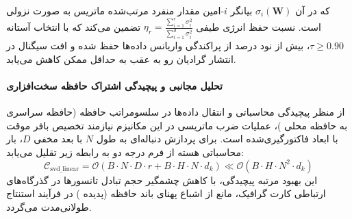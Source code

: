 که در آن $\sigma_i(\mathbf{W})$ بیانگر $i$-امین مقدار منفرد مرتب‌شده ماتریس به صورت نزولی است. نسبت حفظ انرژی طیفی $\eta_r = \frac{\sum_{i=1}^r \sigma_i^2}{\sum_{i=1}^{d} \sigma_i^2}$ تضمین می‌کند که با انتخاب آستانه $\tau \ge 0.90$، بیش از نود درصد از پراکندگی واریانس داده‌ها حفظ شده و افت سیگنال در انتشار گرادیان رو به عقب به حداقل ممکن کاهش می‌یابد.

\paragraph{تحلیل مجانبی و پیچیدگی اشتراک حافظه سخت‌افزاری}
از منظر پیچیدگی محاسباتی و انتقال داده‌ها در سلسومراتب حافظه (حافظه سراسری  به حافظه محلی )، عملیات ضرب ماتریسی در این مکانیزم نیازمند تخصیص بافر موقت با ابعاد فاکتورگیری‌شده است. برای پردازش دنباله‌ای به طول $N$ با بعد مخفی $D$، بار محاسباتی هسته از فرم درجه دو به رابطه زیر تقلیل می‌یابد:
\begin{equation}
\label{eq:complexity_svd_linear}
\mathcal{C}_{\text{svd\_linear}} = \mathcal{O}\left( B \cdot N \cdot D \cdot r + B \cdot H \cdot N \cdot d_k \right) \ll \mathcal{O}\left( B \cdot H \cdot N^2 \cdot d_k \right)
\end{equation}
این بهبود مرتبه پیچیدگی، با کاهش چشمگیر حجم تبادل تانسورها در گذرگاه‌های ارتباطی کارت گرافیک، مانع از اشباع پهنای باند حافظه (پدیده ) در فرآیند استنتاج طولانی‌مدت می‌گردد.

